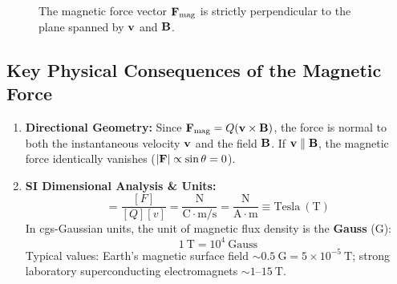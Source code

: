 \begin{figure}[htbp]
    \centering
    \caption{The magnetic force vector $\vb{F}_{\mathrm{mag}}$ is strictly perpendicular to the plane spanned by $\vb{v}$ and $\vb{B}$.}
    \label{fig:f_v_b_geometry}
\end{figure}

\subsection{Key Physical Consequences of the Magnetic Force}
\begin{enumerate}
    \item \textbf{Directional Geometry:} Since $\vb{F}_{\mathrm{mag}} = Q(\vb{v} \times \vb{B})$, the force is normal to both the instantaneous velocity $\vb{v}$ and the field $\vb{B}$. If $\vb{v} \parallel \vb{B}$, the magnetic force identically vanishes ($\abs{\vb{F}} \propto \sin\theta = 0$).
    \item \textbf{SI Dimensional Analysis \& Units:}
    \begin{equation}
        [B] = \frac{[F]}{[Q][v]} = \frac{\mathrm{N}}{\mathrm{C} \cdot \mathrm{m}/\mathrm{s}} = \frac{\mathrm{N}}{\mathrm{A} \cdot \mathrm{m}} \equiv \mathrm{Tesla}\ (\mathrm{T})
    \end{equation}
    In cgs-Gaussian units, the unit of magnetic flux density is the \textbf{Gauss} ($\mathrm{G}$):
    \begin{equation}
        1\ \mathrm{T} = 10^4\ \mathrm{Gauss}
    \end{equation}
    Typical values: Earth's magnetic surface field $\sim 0.5\ \mathrm{G} = 5 \times 10^{-5}\ \mathrm{T}$; strong laboratory superconducting electromagnets $\sim 1\text{--}15\ \mathrm{T}$.
\end{enumerate}

